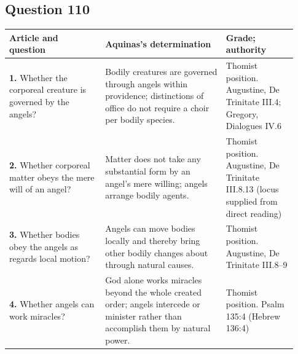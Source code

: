 \subsection{Question 110}
\begin{longtable}{@{}>{\raggedright\arraybackslash}p{0.31\linewidth}>{\raggedright\arraybackslash}p{0.39\linewidth}>{\raggedright\arraybackslash}p{0.23\linewidth}@{}}
\toprule
Article and question & Aquinas's determination & Grade; authority\\
\midrule\endhead
\textbf{1.} Whether the corporeal creature is governed by the angels? & Bodily creatures are governed through angels within providence; distinctions of office do not require a choir per bodily species. & Thomist position. Augustine, De Trinitate III.4; Gregory, Dialogues IV.6\\
\textbf{2.} Whether corporeal matter obeys the mere will of an angel? & Matter does not take any substantial form by an angel's mere willing; angels arrange bodily agents. & Thomist position. Augustine, De Trinitate III.8.13 (locus supplied from direct reading)\\
\textbf{3.} Whether bodies obey the angels as regards local motion? & Angels can move bodies locally and thereby bring other bodily changes about through natural causes. & Thomist position. Augustine, De Trinitate III.8--9\\
\textbf{4.} Whether angels can work miracles? & God alone works miracles beyond the whole created order; angels intercede or minister rather than accomplish them by natural power. & Thomist position. Psalm 135:4 (Hebrew 136:4)\\
\bottomrule
\end{longtable}
